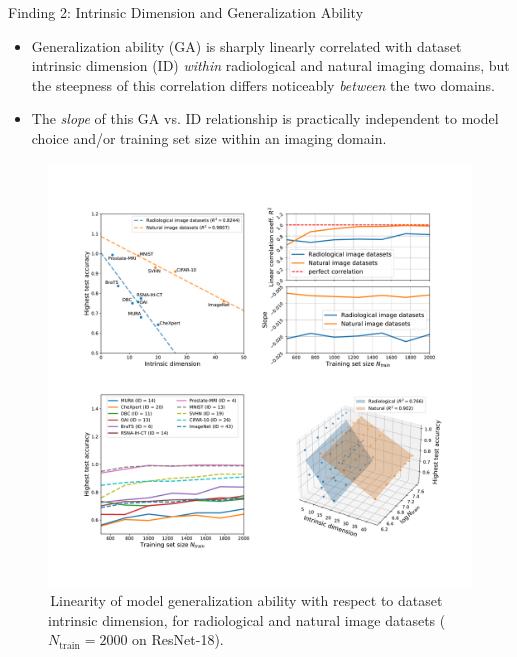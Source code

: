 \documentclass[final,hyperref={pdfpagelabels=false}]{beamer}
\begin{document}
\begin{frame}[t]
\begin{columns}[t]
\begin{column}{.3\textwidth}
\begin{block}{Finding 2: Intrinsic Dimension and Generalization Ability}
\begin{itemize}
    \item Generalization ability (GA) is sharply linearly correlated with dataset intrinsic dimension (ID) \textit{within} radiological and natural imaging domains, but the steepness of this correlation differs noticeably \textit{between} the two domains.
    \item The \textit{slope} of this GA vs. ID relationship is practically independent to model choice and/or training set size within an imaging domain.
\end{itemize}
\begin{figure}
   \label{fig:linear}
   \includegraphics[width=0.75\linewidth]{frompaper/main_fig_multi_0.pdf}
   \caption{\,Linearity of model generalization ability with respect to dataset intrinsic dimension, for \textcolor{paperblue}{radiological} and \textcolor{paperorange}{natural} image datasets ($N_\text{train}=2000$ on ResNet-18).}
\end{figure}
\end{block}



\end{column}
\end{columns}
\end{frame}
\end{document}
